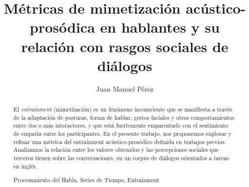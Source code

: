 \documentclass[runningheads,a4paper]{llncs}
\newcommand{\keywords}[1]{\par\addvspace\baselineskip
\noindent\keywordname\enspace\ignorespaces#1}
\begin{document}
\mainmatter  %

\title{Métricas de mimetización acústico-prosódica en hablantes y su relación con rasgos sociales de diálogos}


%
%
\author{Juan Manuel Pérez}
%


%
%

\maketitle


\begin{abstract}
El \emph{entrainment} (mimetización) es un fenómeno inconsciente que se manifiesta a través de la adaptación de posturas, forma de hablar, gestos faciales y otros comportamientos entre dos o más interactores, y que está fuertemente emparentado con el sentimiento de empatía entre los participantes. En el presente trabajo, nos proponemos explorar y refinar una métrica del entrainment acústico-prosódico definida en trabajos previos. Analizamos la relación entre los valores obtenidos y las percepciones sociales que terceros tienen sobre las conversaciones, en un corpus de diálogos orientados a tareas en inglés.
\keywords{Procesamiento del Habla, Series de Tiempo, Entrainment}
\end{abstract}
\end{document}
